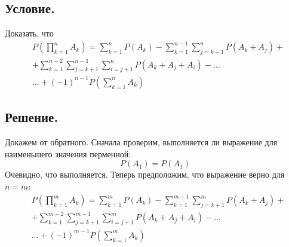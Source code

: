 \documentclass[a4paper, 12pt]{article}
\begin{document}
    \subsection{Условие.}
    Доказать, что
    \begin{align*}
    & P\left(\prod_{k=1}^{n}A_k\right)=\sum\limits_{k=1}^{n}P\left(A_k\right)-\sum\limits_{k=1}^{n-1}\sum\limits_{j=k+1}^{n}
    P\left(A_k+A_j\right)+\\ &+\sum\limits_{k=1}^{n-2}\sum\limits_{j=k+1}^{n-1}\sum\limits_{i=j+1}^{n}P\left(A_k+A_j+A_i\right)
    -\hdots\\ & \hdots +\left(-1\right)^{n-1}P\left(\sum\limits_{k=1}^n A_k\right)
    \end{align*}


    \subsection{Решение.}
    Докажем от обратного. Сначала проверим, выполняется ли выражение для наименьшего значения перменной:
    $$
    P(A_1)=P(A_1)
    $$
    Очевидно, что выполняется. Теперь предположим, что выражение верно для $n=m$:
    \begin{align*}
        & P\left(\prod_{k=1}^{m}A_k\right)=\sum\limits_{k=1}^{m}P\left(A_k\right)-\sum\limits_{k=1}^{m-1}\sum\limits_{j=k+1}^{m}
        P\left(A_k+A_j\right)+\\ &+\sum\limits_{k=1}^{m-2}\sum\limits_{j=k+1}^{m-1}\sum\limits_{i=j+1}^{m}P\left(A_k+A_j+A_i\right)
        -\hdots\\ & \hdots +\left(-1\right)^{m-1}P\left(\sum\limits_{k=1}^m A_k\right)
    \end{align*}
\end{document}
